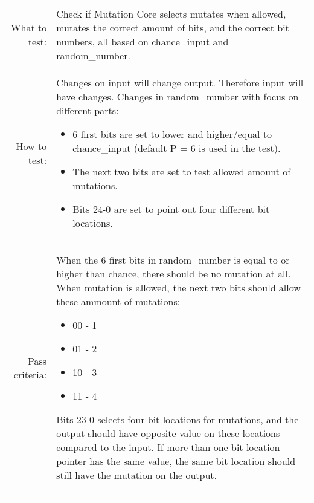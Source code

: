 \begin{table}[H]
  \begin{tabular}{r | p{8cm}}
    \noalign{\smallskip}\hline\noalign{\smallskip}
    
    What to test:  & Check if Mutation Core selects mutates when allowed, mutates the 
                     correct amount of bits, and the correct bit numbers, all based
                     on chance\_input and random\_number.\\

    \noalign{\smallskip}\hline\noalign{\smallskip}

    How to test:   &    Changes on input will change output. Therefore input will have 
                        changes.
                        Changes in random\_number with focus on different parts: 
                        \begin{itemize}
                            \item 6 first bits are set to lower and higher/equal to
                                  chance\_input (default P = 6 is used in the test). 
                            \item The next two bits are set to test allowed amount of 
                                  mutations.
                            \item Bits 24-0 are set to point out four different bit 
                                  locations.
                        \end{itemize}
                        \\
                      
    \noalign{\smallskip}\hline\noalign{\smallskip}

    Pass criteria: &    When the 6 first bits in random\_number is equal to or higher 
                        than chance, there should be no mutation at all.
                        When mutation is allowed, the next two bits should allow these 
                        ammount of mutations:  
                        \begin{itemize}
                            \item 00 - 1
                            \item 01 - 2
                            \item 10 - 3
                            \item 11 - 4
                        \end{itemize}
                        Bits 23-0 selects four bit locations for mutations, and the 
                        output should have opposite value on these locations compared to
                        the input.
                        If more than one bit location pointer has the same value, the 
                        same bit location should still have the mutation on the output.
                                                \\
    \noalign{\smallskip}\hline\noalign{\smallskip}
    

\end{tabular}
\end{table}

